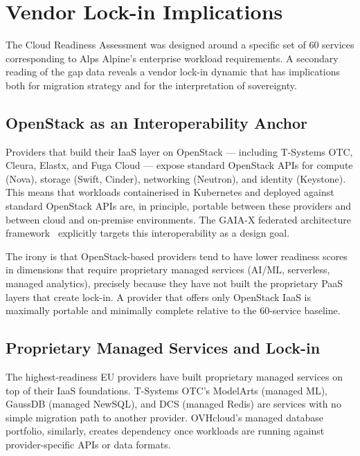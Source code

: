 \section{Vendor Lock-in Implications}
\label{sec:vendor_lockin}

The Cloud Readiness Assessment was designed around a specific set of 60 services corresponding to Alps Alpine's enterprise workload requirements. A secondary reading of the gap data reveals a vendor lock-in dynamic that has implications both for migration strategy and for the interpretation of sovereignty.

\subsection{OpenStack as an Interoperability Anchor}

Providers that build their IaaS layer on OpenStack — including T-Systems OTC, Cleura, Elastx, and Fuga Cloud — expose standard OpenStack APIs for compute (Nova), storage (Swift, Cinder), networking (Neutron), and identity (Keystone). This means that workloads containerised in Kubernetes and deployed against standard OpenStack APIs are, in principle, portable between these providers and between cloud and on-premise environments. The GAIA-X federated architecture framework~\cite{GAIAX_Architecture_2023} explicitly targets this interoperability as a design goal.

The irony is that OpenStack-based providers tend to have lower readiness scores in dimensions that require proprietary managed services (AI/ML, serverless, managed analytics), precisely because they have not built the proprietary PaaS layers that create lock-in. A provider that offers only OpenStack IaaS is maximally portable and minimally complete relative to the 60-service baseline.

\subsection{Proprietary Managed Services and Lock-in}

The highest-readiness EU providers have built proprietary managed services on top of their IaaS foundations. T-Systems OTC's ModelArts (managed ML), GaussDB (managed NewSQL), and DCS (managed Redis) are services with no simple migration path to another provider. OVHcloud's managed database portfolio, similarly, creates dependency once workloads are running against provider-specific APIs or data formats.

